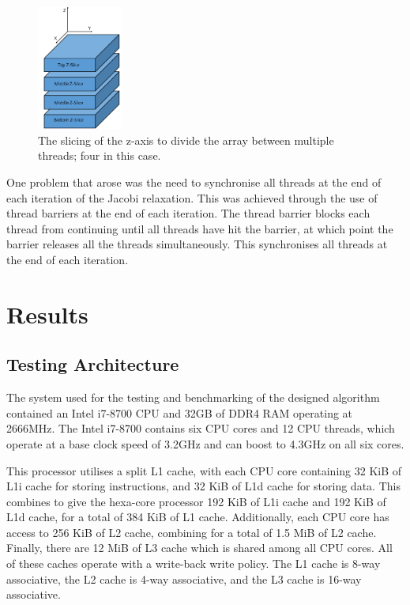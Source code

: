 \documentclass[12pt]{article}
\begin{document}
\begin{figure}[H]
    \begin{center}
        \includegraphics[width=0.25\textwidth]{fig/blocks.png}
        \caption{The slicing of the z-axis to divide the array between multiple threads; four in this case.}
        \label{fig:block-design}
    \end{center}
\end{figure}

One problem that arose was the need to synchronise all threads at the end of each iteration of the Jacobi relaxation.
This was achieved through the use of thread barriers at the end of each iteration. The thread barrier blocks each
thread from continuing until all threads have hit the barrier, at which point the barrier releases all the threads
simultaneously. This synchronises all threads at the end of each iteration.

\section{Results}

\subsection{Testing Architecture}
The system used for the testing and benchmarking of the designed algorithm contained an Intel i7-8700 CPU and
32GB of DDR4 RAM operating at 2666MHz. The Intel i7-8700 contains six CPU cores and 12 CPU threads, which operate
at a base clock speed of 3.2GHz and can boost to 4.3GHz on all six cores. 

This processor utilises a split L1 cache, with each CPU core containing 32 KiB of L1i cache for storing instructions,
and 32 KiB of L1d cache for storing data. This combines to give the hexa-core processor 192 KiB of L1i cache and
192 KiB of L1d cache, for a total of 384 KiB of L1 cache. Additionally, each CPU core has access to 256 KiB of L2
cache, combining for a total of 1.5 MiB of L2 cache. Finally, there are 12 MiB of L3 cache which is shared among
all CPU cores.  All of these caches operate with a write-back write policy. The L1 cache is 8-way associative, the
L2 cache is 4-way associative, and the L3 cache is 16-way associative.
\end{document}
